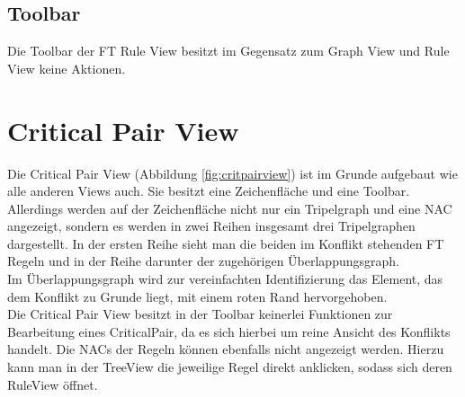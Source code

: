 \subsection{Toolbar}
Die Toolbar der FT Rule View besitzt im Gegensatz zum Graph View und Rule View keine Aktionen.

\section{Critical Pair View}
Die Critical Pair View (Abbildung \ref{fig:critpairview}) ist im Grunde aufgebaut wie alle anderen Views auch. Sie besitzt eine Zeichenfläche und eine Toolbar.\\
Allerdings werden auf der Zeichenfläche nicht nur ein Tripelgraph und eine NAC angezeigt, sondern es werden in zwei Reihen insgesamt drei Tripelgraphen dargestellt. In der ersten Reihe sieht man die beiden im Konflikt stehenden FT Regeln und in der Reihe darunter der zugehörigen Überlappungsgraph. \\
Im Überlappungsgraph wird zur vereinfachten Identifizierung das Element, das dem Konflikt zu Grunde liegt, mit einem roten Rand hervorgehoben.\\
Die Critical Pair View besitzt in der Toolbar keinerlei Funktionen zur Bearbeitung eines CriticalPair, da es sich hierbei um reine Ansicht des Konflikts handelt. Die NACs der Regeln können ebenfalls nicht angezeigt werden. Hierzu kann man in der TreeView die jeweilige Regel direkt anklicken, sodass sich deren RuleView öffnet.